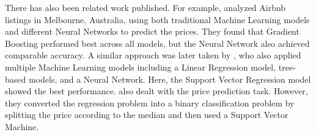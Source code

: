 There has also been related work published. For example, \citet{cai2019} analyzed Airbnb listings in Melbourne, Australia, using both traditional Machine Learning models and different Neural Networks to predict the prices. They found that Gradient Boosting performed best across all models, but the Neural Network also achieved comparable accuracy. 
A similar approach was later taken by \citet{rezazadeh2021}, who also applied multiple Machine Learning models including a Linear Regression model, tree-based models, and a Neural Network. Here, the Support Vector Regression model showed the best performance.
\citet{tang2015} also dealt with the price prediction task. However, they converted the regression problem into a binary classification problem by splitting the price according to the median and then used a Support Vector Machine.  
























